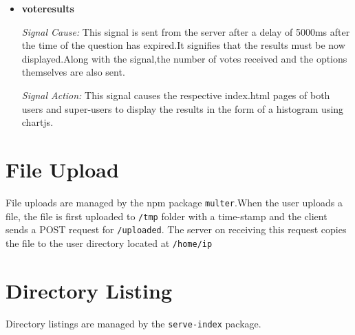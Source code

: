 \documentclass[a4paper,10pt]{article}
\begin{document}
\begin{itemize}
\item \textbf{voteresults}

\textit{Signal Cause:}
    This signal is sent from the server after a delay of 5000ms after the time of the question
has expired.It signifies that the results must be now displayed.Along with the signal,the number of
votes received and the options themselves are also sent.

\textit{Signal Action:}
    This signal causes the respective index.html pages of both users and super-users to display
the results in the form of a histogram using chartjs.    

\end{itemize}

\section{File Upload}
File uploads are managed by the npm package \texttt{multer}.When the user uploads a file,
the file is first uploaded to \texttt{/tmp} folder with a time-stamp and the client sends a POST request for \texttt{/uploaded}.
The server on receiving this request copies the file to the user directory located at \texttt{/home/ip}

\section{Directory Listing}
Directory listings are managed by the \texttt{serve-index} package.
\end{document}
